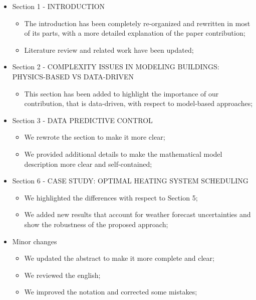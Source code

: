 \documentclass{article}
\begin{document}
\begin{itemize}

	\item Section 1 - INTRODUCTION
	\begin{itemize}
		\item The introduction has been completely re-organized and rewritten in most of its parts, with a more detailed explanation of the paper contribution;
		\item Literature review and related work have been updated;
	\end{itemize}

	\item Section 2 - COMPLEXITY ISSUES IN MODELING BUILDINGS: PHYSICS-BASED VS DATA-DRIVEN
	\begin{itemize}
		\item This section has been added to highlight the importance of our contribution, that is data-driven, with respect to model-based approaches;
	\end{itemize}

	\item Section 3 - DATA PREDICTIVE CONTROL
	\begin{itemize}
		\item We rewrote the section to make it more clear;
		\item We provided additional details to make the mathematical model description more clear and self-contained;
	\end{itemize}

	\item Section 6 - CASE STUDY: OPTIMAL HEATING SYSTEM SCHEDULING
	\begin{itemize}
		\item We highlighted the differences with respect to Section 5;
		\item We added new results that account for weather forecast uncertainties and show the robustness of the proposed approach;
	\end{itemize}

	\item Minor changes
	\begin{itemize}
		\item We updated the abstract to make it more complete and clear;
		\item We reviewed the english;
		\item We improved the notation and corrected some mistakes;
	\end{itemize}

\end{itemize}
\end{document}
